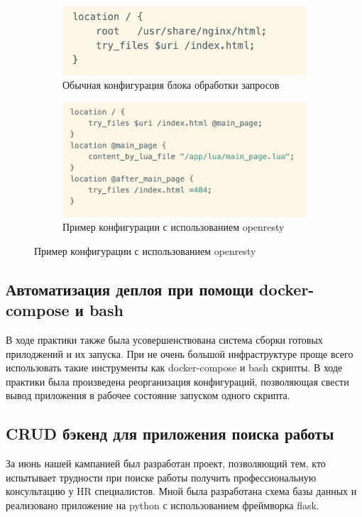 \documentclass[a4papaer,12pt]{article}
\begin{document}
\begin{figure}[H]
    \begin{subfigure}[b]{.49\linewidth}
    \includegraphics[width=\linewidth]{1}
    \caption{Обычная конфигурация блока обработки запросов}
    \end{subfigure}
    \begin{subfigure}[b]{.49\linewidth}
    \includegraphics[width=\linewidth]{2}
    \caption{Пример конфигурации с использованием openresty}
    \end{subfigure}
\end{figure}

\subsection{Автоматизация деплоя при помощи docker-compose и bash}

В ходе практики также была усовершенствована система сборки готовых прилоджений и их 
запуска. При не очень большой инфраструктуре проще всего использовать такие инструменты
как docker-compose и bash скрипты. В ходе практики была произведена реорганизация 
конфигураций, позволяющая свести вывод приложения в рабочее состояние запуском одного скрипта.

\subsection{CRUD бэкенд для приложения поиска работы}

За июнь нашей кампанией был разработан проект, позволяющий тем, кто испытывает трудности при поиске работы
получить профессиональную консультацию у HR специалистов. Мной была разработана схема базы данных 
и реализовано приложение\cite{cvtr_api_docs} на python с использованием фреймворка flask\cite{flask}.  
\end{document}
